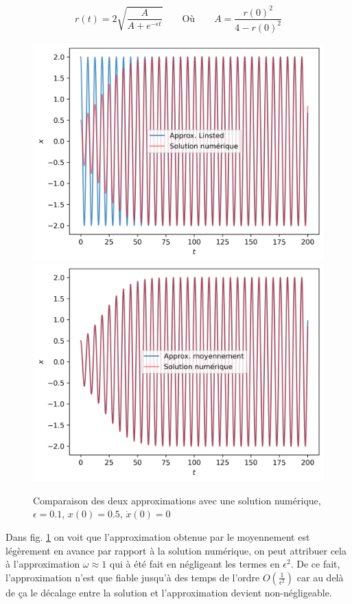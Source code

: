 %
\begin{equation}
    r(t) = 2 \sqrt{ \frac{A}{A + e^{-\epsilon t}} }
    \qquad
    \text{Où}
    \qquad 
    A = \frac{r(0)^2}{4 - r(0)^2}
\end{equation}
%
\begin{figure}
    \centering
    \begin{subcaptionblock}{.90\linewidth}
        \includegraphics[width=.5\linewidth]{images/vdp/vdp_approx_linsted.png}%
        \hfill
        \includegraphics[width=.5\linewidth]{images/vdp/vdp_approx_transient.png}%
    \end{subcaptionblock}
    \caption{Comparaison des deux approximations avec une solution numérique, $\epsilon=0.1$, $x(0)=0.5$, $\dot{x}(0)=0$}
    \label{fig:vdp_approx}
\end{figure}
%
Dans {fig. \ref{fig:vdp_approx}} on voit que l'approximation obtenue par le moyennement est légèrement en avance par rapport à la solution numérique, on peut attribuer cela à l'approximation $\omega \approx 1$ qui à été fait en négligeant les termes en $\epsilon^2$. 
De ce fait, l'approximation n'est que fiable jusqu'à des temps de l'ordre $O\left( \frac{1}{\epsilon^2} \right)$ car au delà de ça le décalage entre la solution et l'approximation devient non-négligeable.
